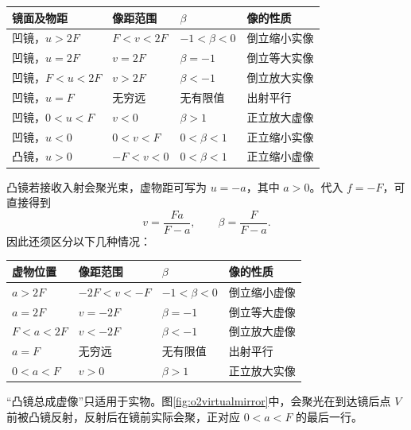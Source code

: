 \begin{center}\small
\begin{tabular}{@{}llll@{}}
\toprule
镜面及物距 & 像距范围 & \(\beta\) & 像的性质\\
\midrule
凹镜，\(u>2F\) & \(F<v<2F\) & \(-1<\beta<0\) & 倒立缩小实像\\
凹镜，\(u=2F\) & \(v=2F\) & \(\beta=-1\) & 倒立等大实像\\
凹镜，\(F<u<2F\) & \(v>2F\) & \(\beta<-1\) & 倒立放大实像\\
凹镜，\(u=F\) & 无穷远 & 无有限值 & 出射平行\\
凹镜，\(0<u<F\) & \(v<0\) & \(\beta>1\) & 正立放大虚像\\
凹镜，\(u<0\) & \(0<v<F\) & \(0<\beta<1\) & 正立缩小实像\\
凸镜，\(u>0\) & \(-F<v<0\) & \(0<\beta<1\) & 正立缩小虚像\\
\bottomrule
\end{tabular}
\end{center}

凸镜若接收入射会聚光束，虚物距可写为 \(u=-a\)，其中 \(a>0\)。代入 \(f=-F\)，可直接得到
\[
 v=\frac{Fa}{F-a},\qquad \beta=\frac{F}{F-a}.
\]
因此还须区分以下几种情况：
\begin{center}\small
\begin{tabular}{@{}llll@{}}
\toprule
虚物位置 & 像距范围 & \(\beta\) & 像的性质\\
\midrule
\(a>2F\) & \(-2F<v<-F\) & \(-1<\beta<0\) & 倒立缩小虚像\\
\(a=2F\) & \(v=-2F\) & \(\beta=-1\) & 倒立等大虚像\\
\(F<a<2F\) & \(v<-2F\) & \(\beta<-1\) & 倒立放大虚像\\
\(a=F\) & 无穷远 & 无有限值 & 出射平行\\
\(0<a<F\) & \(v>0\) & \(\beta>1\) & 正立放大实像\\
\bottomrule
\end{tabular}
\end{center}
“凸镜总成虚像”只适用于实物。图\ref{fig:o2virtualmirror}中，会聚光在到达镜后点 \(V\) 前被凸镜反射，反射后在镜前实际会聚，正对应 \(0<a<F\) 的最后一行。

